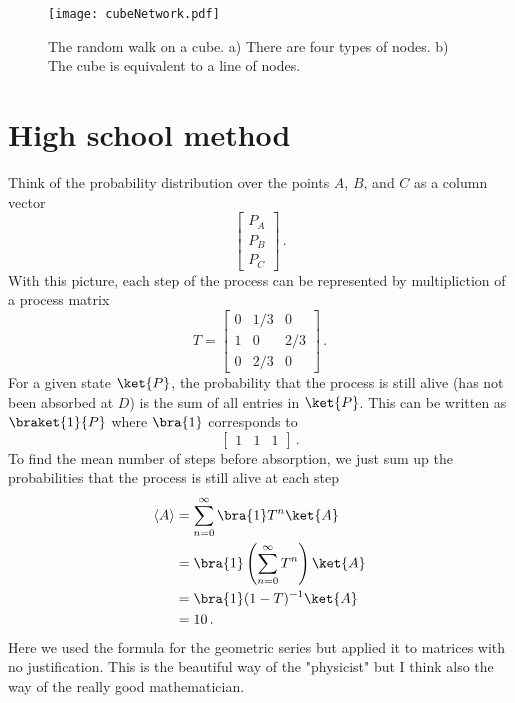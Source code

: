 \documentclass{article}
\begin{document}
\begin{figure}
\begin{centering}
\texttt{[image: cubeNetwork.pdf]} 
\par\end{centering}
\caption{The random walk on a cube. a) There are four types of nodes. b) The cube is equivalent to a line of nodes.}
\label{Fig:cubeNetwork}
\end{figure}


\section{High school method}

Think of the probability distribution over the points $A$, $B$, and $C$ as a column vector
\begin{equation}
\left[ \begin{matrix} P_A \\ P_B \\ P_C \end{matrix} \right] \, .
\end{equation}
With this picture, each step of the process can be represented by multipliction of a process matrix
\begin{equation}
T = \left[ \begin{matrix} 0 & 1/3 & 0 \\ 1 & 0 & 2/3 \\ 0 & 2/3 & 0 \end{matrix} \right] \, .
\end{equation}
For a given state $\ket{P}$, the probability that the process is still alive (has not been absorbed at $D$) is the sum of all entries in $\ket{P}$.
This can be written as $\braket{1}{P}$ where $\bra{1}$ corresponds to \begin{equation}
\left[ \begin{matrix} 1 & 1 & 1 \end{matrix} \right] \, .
\end{equation}
To find the mean number of steps before absorption, we just sum up the probabilities that the process is still alive at each step \begin{align*}
\langle A \rangle &= \sum_{n=0}^{\infty} \bra{1} T^n \ket{A} \\
&= \bra{1} \left( \sum_{n=0}^{\infty} T^n \right) \ket{A} \\
&= \bra{1} (1-T)^{-1} \ket{A} \\
&= 10 \, .
\end{align*}
Here we used the formula for the geometric series but applied it to matrices with no justification.
This is the beautiful way of the "physicist" but I think also the way of the really good mathematician.
\end{document}

